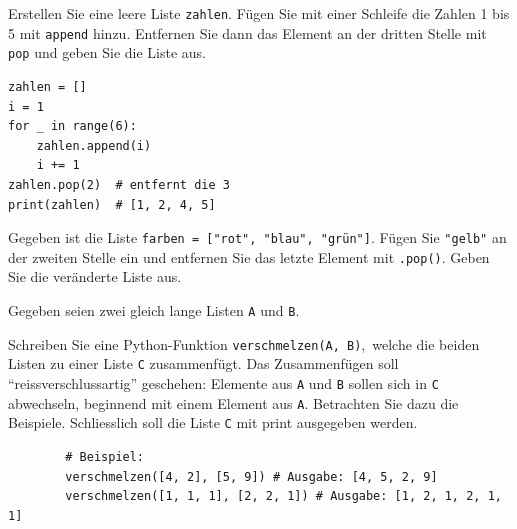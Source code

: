 \begin{myexercise}
	Erstellen Sie eine leere Liste \lstinline|zahlen|. Fügen Sie mit einer Schleife die Zahlen 1 bis 5 mit \lstinline|append| hinzu. Entfernen Sie dann das Element an der dritten Stelle mit \lstinline|pop| und geben Sie die Liste aus.

	\begin{myanswer}
		\begin{lstlisting}
zahlen = []
i = 1
for _ in range(6):
    zahlen.append(i)
    i += 1
zahlen.pop(2)  # entfernt die 3
print(zahlen)  # [1, 2, 4, 5]
\end{lstlisting}
	\end{myanswer}
\end{myexercise}

\begin{myexercise}
	Gegeben ist die Liste \lstinline|farben = ["rot", "blau", "grün"]|. Fügen Sie \lstinline|"gelb"| an der zweiten Stelle ein und entfernen Sie das letzte Element mit \lstinline|.pop()|. Geben Sie die veränderte Liste aus.

	\begin{myanswer}
		
	\end{myanswer}
\end{myexercise}

\begin{myexercise}
	Gegeben seien zwei gleich lange Listen \texttt{A} und \texttt{B}.

	Schreiben Sie eine Python-Funktion \lstinline|verschmelzen(A, B)|, welche die beiden Listen zu einer Liste \texttt{C} zusammenfügt. Das Zusammenfügen soll \enquote{reissverschlussartig} geschehen: Elemente aus \texttt{A} und \texttt{B} sollen sich in \texttt{C} abwechseln, beginnend mit einem Element aus \texttt{A}. Betrachten Sie dazu die Beispiele. Schliesslich soll die Liste \texttt{C} mit print ausgegeben werden.

	\begin{lstlisting}
		# Beispiel:
		verschmelzen([4, 2], [5, 9]) # Ausgabe: [4, 5, 2, 9]
		verschmelzen([1, 1, 1], [2, 2, 1]) # Ausgabe: [1, 2, 1, 2, 1, 1]
	\end{lstlisting}

	\begin{myanswer}
		
	\end{myanswer}
\end{myexercise}

